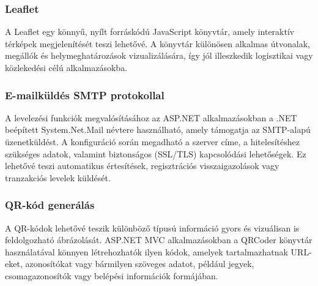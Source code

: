 \subsubsection{Leaflet}

\indent A Leaflet egy könnyű, nyílt forráskódú JavaScript könyvtár, amely interaktív térképek megjelenítését teszi lehetővé. A könyvtár különösen alkalmas útvonalak, megállók és helymeghatározások vizualizálására, így jól illeszkedik logisztikai vagy közlekedési célú alkalmazásokba.

\subsubsection{E-mailküldés SMTP protokollal}

\indent A levelezési funkciók megvalósításához az ASP.NET alkalmazásokban a .NET beépített System.Net.Mail névtere használható, amely támogatja az SMTP-alapú üzenetküldést. A konfiguráció során megadható a szerver címe, a hitelesítéshez szükséges adatok, valamint biztonságos (SSL/TLS) kapcsolódási lehetőségek. Ez lehetővé teszi automatikus értesítések, regisztrációs visszaigazolások vagy tranzakciós levelek küldését.

\subsubsection{QR-kód generálás}

\indent A QR-kódok lehetővé teszik különböző típusú információ gyors és vizuálisan is feldolgozható ábrázolását. ASP.NET MVC alkalmazásokban a QRCoder könyvtár használatával könnyen létrehozhatók ilyen kódok, amelyek tartalmazhatnak URL-eket, azonosítókat vagy bármilyen szöveges adatot, például jegyek, csomagazonosítók vagy belépési információk formájában.


